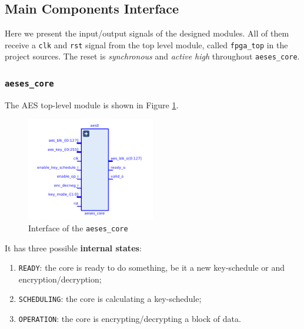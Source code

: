 \subsection{Main Components Interface}

Here we present the input/output signals of the designed modules.
All of them receive a \texttt{clk} and \texttt{rst} signal from the top level module,
called \texttt{fpga\_top} in the project sources.
The reset is \textit{synchronous} and \textit{active high} throughout \texttt{aeses\_core}.

\subsubsection{\texttt{aeses\_core}}

The AES top-level module is shown in Figure \ref{fig:aeses_core}.

\begin{figure}[h]
  \centering
  \includegraphics[width=0.5\textwidth]{figures/aeses_core}
	  \caption{Interface of the \texttt{aeses\_core}}
  \label{fig:aeses_core}
\end{figure}

It has three possible \textbf{internal states}:
\begin{enumerate}
	\item \texttt{READY}: the core is ready to do something, be it a new key-schedule
or and encryption/decryption;
	\item \texttt{SCHEDULING}: the core is calculating a key-schedule;
	\item \texttt{OPERATION}: the core is encrypting/decrypting a block of data.
\end{enumerate}

